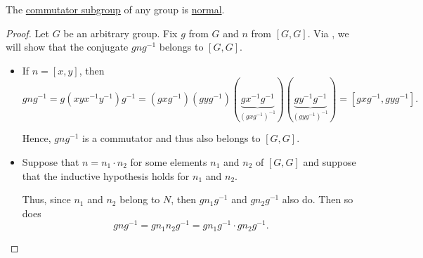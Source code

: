 \begin{proposition}\label{thm:commutator_subgroup_is_normal}
  The \hyperref[def:group_commutator]{commutator subgroup} of any group is \hyperref[def:normal_subgroup]{normal}.
\end{proposition}
\begin{proof}
  Let \( G \) be an arbitrary group. Fix \( g \) from \( G \) and \( n \) from \( [G, G] \). Via , we will show that the conjugate \( g n g^{-1} \) belongs to \( [G, G] \).

  \begin{itemize}
    \item If \( n = [x, y] \), then
    \begin{equation*}
      g n g^{-1}
      =
      g(xyx^{-1}y^{-1})g^{-1}
      =
      (gxg^{-1}) (gyg^{-1}) (\underbrace{gx^{-1}g^{-1}}_{(gxg^{-1})^{-1}}) (\underbrace{gy^{-1}g^{-1}}_{(gyg^{-1})^{-1}})
      =
      [gxg^{-1}, gyg^{-1}].
    \end{equation*}

    Hence, \( gng^{-1} \) is a commutator and thus also belongs to \( [G, G] \).

    \item Suppose that \( n = n_1 \cdot n_2 \) for some elements \( n_1 \) and \( n_2 \) of \( [G, G] \) and suppose that the inductive hypothesis holds for \( n_1 \) and \( n_2 \).

    Thus, since \( n_1 \) and \( n_2 \) belong to \( N \), then \( g n_1 g^{-1} \) and \( g n_2 g^{-1} \) also do. Then so does
    \begin{equation*}
      gng^{-1}
      =
      g n_1 n_2 g^{-1}
      =
      g n_1 g^{-1} \cdot g n_2 g^{-1}.
    \end{equation*}
  \end{itemize}
\end{proof}

